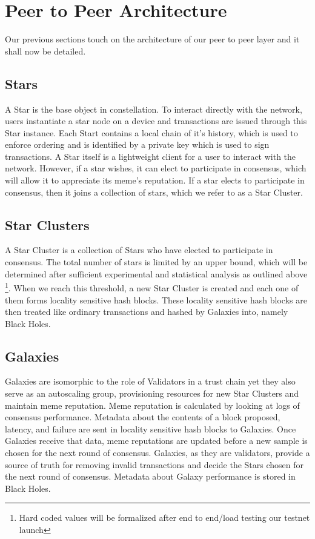 \documentclass{article}
\begin{document}
\section{Peer to Peer Architecture}
Our previous sections touch on the architecture of our peer to peer layer and it shall now be detailed. 

\subsection{Stars}
A Star is the base object in constellation. To interact directly with the network, users instantiate a star node on a device and transactions are issued through this Star instance. Each Start contains a local chain of it's history, which is used to enforce ordering and is identified by a private key which is used to sign transactions. A Star itself is a lightweight client for a user to interact with the network. However, if a star wishes, it can elect to participate in consensus, which will allow it to appreciate its meme's reputation. If a star elects to participate in consensus, then it joins a collection of stars, which we refer to as a Star Cluster.

\subsection{Star Clusters}
A Star Cluster is a collection of Stars who have elected to participate in consensus. The total number of stars is limited by an upper bound, which will be determined after sufficient experimental and statistical analysis as outlined above \footnote{Hard coded values will be formalized after end to end/load testing our testnet launch}. When we reach this threshold, a new Star Cluster is created and each one of them forms locality sensitive hash blocks. These locality sensitive hash blocks are then treated like ordinary transactions and hashed by Galaxies into, namely Black Holes.

\subsection{Galaxies}
Galaxies are isomorphic to the role of Validators in a trust chain yet they also serve as an autoscaling group, provisioning resources for new Star Clusters and maintain meme reputation. Meme reputation is calculated by looking at logs of consensus performance. Metadata about the contents of a block proposed, latency, and failure are sent in locality sensitive hash blocks to Galaxies. Once Galaxies receive that data, meme reputations are updated before a new sample is chosen for the next round of consensus. Galaxies, as they are validators, provide a source of truth for removing invalid transactions and decide the Stars chosen for the next round of consensus. Metadata about Galaxy performance is stored in Black Holes.
\end{document}
